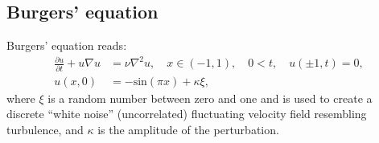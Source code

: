 \subsection{Burgers' equation}
\label{sec:mortensen:burgers}

Burgers' equation reads:
\begin{align}
 \frac{\partial u}{\partial t}+u \nabla u
  &= \nu \nabla^2 u, \quad x \in (-1,1), \quad 0<t, \quad u(\pm 1,t)=0,
\\
 u(x,0) &=-\text{sin}(\pi x)+\kappa \xi,
\label{eq:mortensen:burgers}
\end{align}
where $\xi$ is a random number between zero and one and is used to create
a discrete ``white noise'' (uncorrelated) fluctuating velocity field
resembling turbulence, and $\kappa$ is the amplitude of the perturbation.


